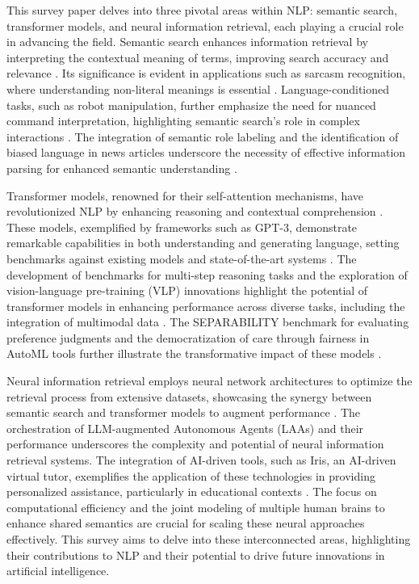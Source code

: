 This survey paper delves into three pivotal areas within NLP: semantic search, transformer models, and neural information retrieval, each playing a crucial role in advancing the field. Semantic search enhances information retrieval by interpreting the contextual meaning of terms, improving search accuracy and relevance \cite{kaur2024cropcontextwiserobuststatic}. Its significance is evident in applications such as sarcasm recognition, where understanding non-literal meanings is essential \cite{lin2023interpretabilityframeworksimilarcase}. Language-conditioned tasks, such as robot manipulation, further emphasize the need for nuanced command interpretation, highlighting semantic search's role in complex interactions \cite{pandy2024advancementsroboticsprocessautomation}. The integration of semantic role labeling and the identification of biased language in news articles underscore the necessity of effective information parsing for enhanced semantic understanding \cite{yamshchikov2020styletransferparaphraselookingsensible}.



Transformer models, renowned for their self-attention mechanisms, have revolutionized NLP by enhancing reasoning and contextual comprehension \cite{zolfaghari2023surveyautomateddetectionclassification}. These models, exemplified by frameworks such as GPT-3, demonstrate remarkable capabilities in both understanding and generating language, setting benchmarks against existing models and state-of-the-art systems \cite{mcguffie2020radicalizationrisksgpt3advanced}. The development of benchmarks for multi-step reasoning tasks \cite{bogoychev2020domaintranslationesenoisesynthetic} and the exploration of vision-language pre-training (VLP) innovations highlight the potential of transformer models in enhancing performance across diverse tasks, including the integration of multimodal data \cite{alayrac2022flamingo}. The SEPARABILITY benchmark for evaluating preference judgments and the democratization of care through fairness in AutoML tools further illustrate the transformative impact of these models \cite{chowdhery2023palm}.



Neural information retrieval employs neural network architectures to optimize the retrieval process from extensive datasets, showcasing the synergy between semantic search and transformer models to augment performance \cite{le2019evolvingselfsupervisedneuralnetworks}. The orchestration of LLM-augmented Autonomous Agents (LAAs) and their performance underscores the complexity and potential of neural information retrieval systems. The integration of AI-driven tools, such as Iris, an AI-driven virtual tutor, exemplifies the application of these technologies in providing personalized assistance, particularly in educational contexts \cite{adak2022automaticnumberplaterecognition}. The focus on computational efficiency and the joint modeling of multiple human brains to enhance shared semantics are crucial for scaling these neural approaches effectively. This survey aims to delve into these interconnected areas, highlighting their contributions to NLP and their potential to drive future innovations in artificial intelligence.



